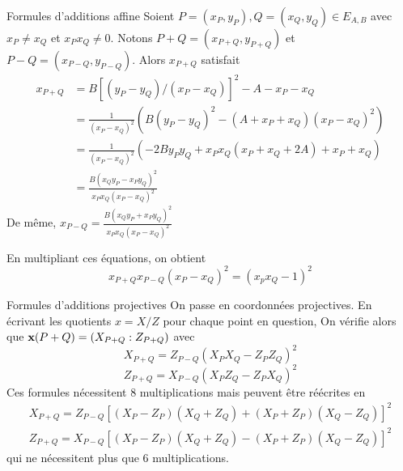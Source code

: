 \documentclass{beamer}
\begin{document}
\begin{frame}[noframenumbering]{Formules d'additions affine}\small
	Soient $P=(x_P,y_P), Q=(x_Q,y_Q) \in E_{A,B}$ avec $x_P \neq x_Q$ et $x_P x_Q \neq 0$.
	Notons $P+Q=(x_{P+Q},y_{P+Q})$ et $P-Q=(x_{P-Q},y_{P-Q})$. Alors $x_{P+Q}$ satisfait
	\[\begin{aligned}
		x_{P+Q}	&= B[(y_P - y_Q)/(x_P-x_Q)]^2 - A - x_P - x_Q \\
		&= \frac{1}{(x_P-x_Q)^2}( B(y_P - y_Q)^2 - (A + x_P + x_Q)(x_P - x_Q)^2) \\
		&= \frac{1}{(x_P-x_Q)^2}( -2B y_P y_Q + x_P x_Q (x_P + x_Q + 2A) + x_P + x_Q) \\
		&= \frac{B(x_Q y_P - x_P y_Q)^2}{x_P x_Q (x_P-x_Q)^2}
	\end{aligned}\]
	De même, $x_{P-Q} = \frac{B(x_Q y_P + x_P y_Q)^2}{x_P x_Q (x_P-x_Q)^2}$

	En multipliant ces équations, on obtient
	\[x_{P+Q} x_{P-Q} (x_P - x_Q)^2 = (x_p x_Q -1)^2\]
\end{frame}

\begin{frame}[noframenumbering]{Formules d'additions projectives}\small
	On passe en coordonnées projectives. En écrivant les quotients $x=X/Z$ pour chaque point en question,
	On vérifie alors que $\textbf{x}(P+Q)=(X_{P+Q}:Z_{P+Q})$ avec \[X_{P+Q} = Z_{P-Q}(X_P X_Q - Z_P Z_Q)^2\]\[Z_{P+Q} = X_{P-Q}(X_P Z_Q - Z_P X_Q)^2\]
	Ces formules nécessitent 8 multiplications mais peuvent être réécrites en
	\[\begin{array}{l}
		X_{P+Q} = Z_{P-Q}[(X_P-Z_P)(X_Q+Z_Q) + (X_P+Z_P)(X_Q-Z_Q)]^2\\
		Z_{P+Q} = X_{P-Q}[(X_P-Z_P)(X_Q+Z_Q) - (X_P+Z_P)(X_Q-Z_Q)]^2
	\end{array}\]
	qui ne nécessitent plus que 6 multiplications.
\end{frame}
\end{document}
